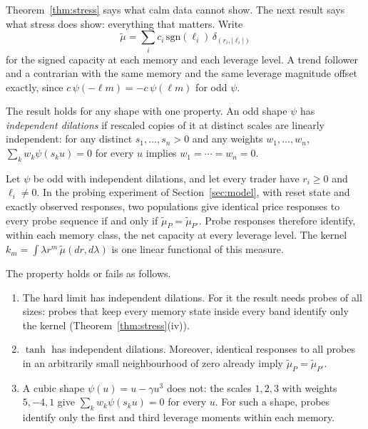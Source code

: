 Theorem~\ref{thm:stress} says what calm data cannot show. The next result says what stress does show: everything that matters. Write
\[
 \tilde\mu=\sum_ic_i\,\mathrm{sgn}(\ell_i)\,\delta_{(r_i,|\ell_i|)}
\]
for the signed capacity at each memory and each leverage level. A trend follower and a contrarian with the same memory and the same leverage magnitude offset exactly, since $c\,\psi(-\ell m)=-c\,\psi(\ell m)$ for odd $\psi$.

The result holds for any shape with one property. An odd shape $\psi$ has \emph{independent dilations} if rescaled copies of it at distinct scales are linearly independent: for any distinct $s_1,\ldots,s_n>0$ and any weights $w_1,\ldots,w_n$, $\sum_kw_k\psi(s_ku)=0$ for every $u$ implies $w_1=\cdots=w_n=0$.

\begin{theorem}\label{thm:satident}
Let $\psi$ be odd with independent dilations, and let every trader have $r_i\ge0$ and $\ell_i\ne0$. In the probing experiment of Section~\ref{sec:model}, with reset state and exactly observed responses, two populations give identical price responses to every probe sequence if and only if $\tilde\mu_P=\tilde\mu_{P'}$. Probe responses therefore identify, within each memory class, the net capacity at every leverage level. The kernel $k_m=\int\lambda r^m\,\tilde\mu(dr,d\lambda)$ is one linear functional of this measure.

The property holds or fails as follows.
\begin{enumerate}[label=(\roman*),itemsep=1pt]
\item The hard limit has independent dilations. For it the result needs probes of all sizes: probes that keep every memory state inside every band identify only the kernel (Theorem~\ref{thm:stress}(iv)).
\item $\tanh$ has independent dilations. Moreover, identical responses to all probes in an arbitrarily small neighbourhood of zero already imply $\tilde\mu_P=\tilde\mu_{P'}$.
\item A cubic shape $\psi(u)=u-\gamma u^3$ does not: the scales $1,2,3$ with weights $5,-4,1$ give $\sum_kw_k\psi(s_ku)=0$ for every $u$. For such a shape, probes identify only the first and third leverage moments within each memory.
\end{enumerate}
\end{theorem}

